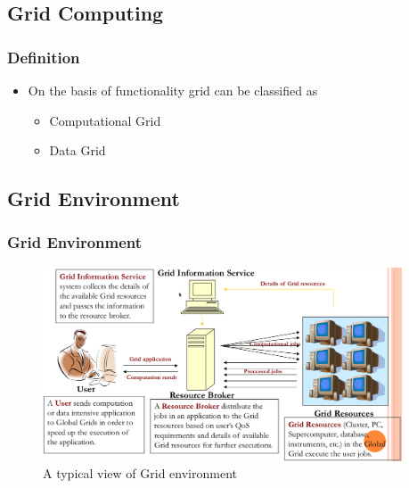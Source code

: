 \documentclass{beamer}
\begin{document}
\subsection*{Grid Computing}
\begin{frame}[label=back2]
 \frametitle{Definition}
\begin{itemize}
	\begin{block}{Grid Computing (Defn)}
		 Grid is a type of parallel and distributed system that enables sharing, selection and aggregation of  geographically distributed resources dynamically at run time depending on their availability, capability, performance, cost, user’s quality-of self-service requirement \cite{buyya2005gentle} \hyperlink{supplement2}{}
	\end{block}
	\item On the basis of functionality grid can be classified as 
	\begin{itemize}
	\item Computational Grid \hyperlink{supplement3}{}
	\item Data Grid \hyperlink{supplement3}{}
	\end{itemize}
\end{itemize}
\end{frame}


\subsection*{Grid Environment}
\begin{frame}[label=main1]
 \frametitle{Grid Environment} 
\begin{figure}[t]
\centering
\includegraphics[width=0.95\textwidth]{imgs/gridenv}
\caption{A typical view of Grid environment}
\end{figure}
\end{frame}
\end{document}
